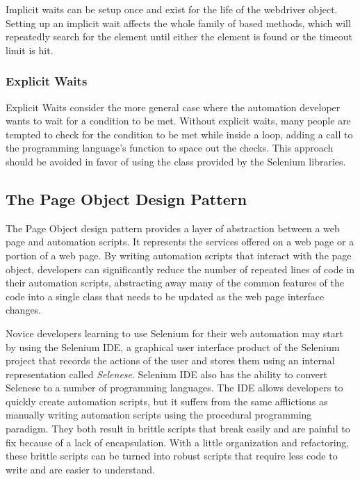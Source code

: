 Implicit waits can be setup once and exist for the life of the webdriver
object.  Setting up an implicit wait affects the whole family of
 based methods, which will repeatedly search for the
element until either the element is found or the timeout limit is hit.

\subsubsection{Explicit Waits}
\label{sssec:external_libs_selenium_explicit_waits}

Explicit Waits consider the more general case where the automation developer
wants to wait for a condition to be met. Without explicit waits, many people
are tempted to check for the condition to be met while inside a 
loop, adding a call to the programming language's  function
to space out the checks.  This approach should be avoided in favor of using the
 class provided by the Selenium libraries.


\subsection{The Page Object Design Pattern}
\label{ssec:external_libs_selenium_page_objects}

The Page Object design pattern provides a layer of abstraction between a web
page and automation scripts. It represents the services offered on a web page
or a portion of a web page. By writing automation scripts that interact with
the page object, developers can significantly reduce the number of repeated
lines of code in their automation scripts, abstracting away many of the common
features of the code into a single class that needs to be updated as the web
page interface changes.



Novice developers learning to use Selenium for their web automation may start
by using the Selenium IDE, a graphical user interface product of the Selenium
project that records the actions of the user and stores them using an internal
representation called \textit{Selenese}. Selenium IDE also has the ability to
convert Selenese to a number of programming languages. The IDE allows
developers to quickly create automation scripts, but it suffers from the same
afflictions as manually writing automation scripts using the procedural
programming paradigm.  They both result in brittle scripts that break easily
and are painful to fix because of a lack of encapsulation.  With a little
organization and refactoring, these brittle scripts can be turned into robust
scripts that require less code to write and are easier to understand.

